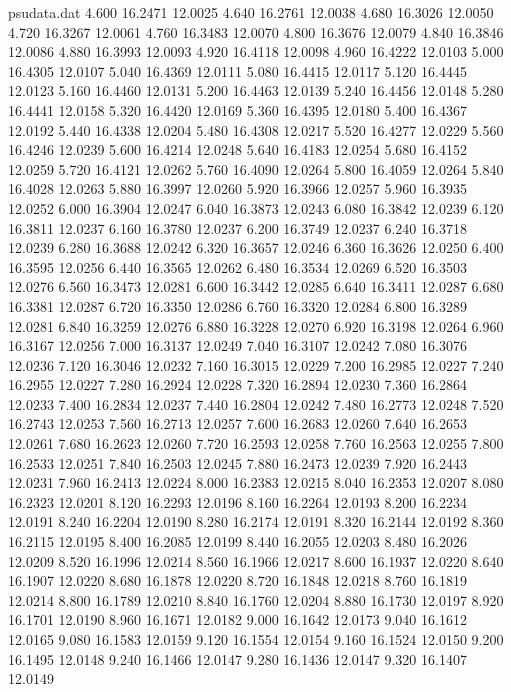 \begin{filecontents*}{psudata.dat}
4.600 16.2471 12.0025
4.640 16.2761 12.0038
4.680 16.3026 12.0050
4.720 16.3267 12.0061
4.760 16.3483 12.0070
4.800 16.3676 12.0079
4.840 16.3846 12.0086
4.880 16.3993 12.0093
4.920 16.4118 12.0098
4.960 16.4222 12.0103
5.000 16.4305 12.0107
5.040 16.4369 12.0111
5.080 16.4415 12.0117
5.120 16.4445 12.0123
5.160 16.4460 12.0131
5.200 16.4463 12.0139
5.240 16.4456 12.0148
5.280 16.4441 12.0158
5.320 16.4420 12.0169
5.360 16.4395 12.0180
5.400 16.4367 12.0192
5.440 16.4338 12.0204
5.480 16.4308 12.0217
5.520 16.4277 12.0229
5.560 16.4246 12.0239
5.600 16.4214 12.0248
5.640 16.4183 12.0254
5.680 16.4152 12.0259
5.720 16.4121 12.0262
5.760 16.4090 12.0264
5.800 16.4059 12.0264
5.840 16.4028 12.0263
5.880 16.3997 12.0260
5.920 16.3966 12.0257
5.960 16.3935 12.0252
6.000 16.3904 12.0247
6.040 16.3873 12.0243
6.080 16.3842 12.0239
6.120 16.3811 12.0237
6.160 16.3780 12.0237
6.200 16.3749 12.0237
6.240 16.3718 12.0239
6.280 16.3688 12.0242
6.320 16.3657 12.0246
6.360 16.3626 12.0250
6.400 16.3595 12.0256
6.440 16.3565 12.0262
6.480 16.3534 12.0269
6.520 16.3503 12.0276
6.560 16.3473 12.0281
6.600 16.3442 12.0285
6.640 16.3411 12.0287
6.680 16.3381 12.0287
6.720 16.3350 12.0286
6.760 16.3320 12.0284
6.800 16.3289 12.0281
6.840 16.3259 12.0276
6.880 16.3228 12.0270
6.920 16.3198 12.0264
6.960 16.3167 12.0256
7.000 16.3137 12.0249
7.040 16.3107 12.0242
7.080 16.3076 12.0236
7.120 16.3046 12.0232
7.160 16.3015 12.0229
7.200 16.2985 12.0227
7.240 16.2955 12.0227
7.280 16.2924 12.0228
7.320 16.2894 12.0230
7.360 16.2864 12.0233
7.400 16.2834 12.0237
7.440 16.2804 12.0242
7.480 16.2773 12.0248
7.520 16.2743 12.0253
7.560 16.2713 12.0257
7.600 16.2683 12.0260
7.640 16.2653 12.0261
7.680 16.2623 12.0260
7.720 16.2593 12.0258
7.760 16.2563 12.0255
7.800 16.2533 12.0251
7.840 16.2503 12.0245
7.880 16.2473 12.0239
7.920 16.2443 12.0231
7.960 16.2413 12.0224
8.000 16.2383 12.0215
8.040 16.2353 12.0207
8.080 16.2323 12.0201
8.120 16.2293 12.0196
8.160 16.2264 12.0193
8.200 16.2234 12.0191
8.240 16.2204 12.0190
8.280 16.2174 12.0191
8.320 16.2144 12.0192
8.360 16.2115 12.0195
8.400 16.2085 12.0199
8.440 16.2055 12.0203
8.480 16.2026 12.0209
8.520 16.1996 12.0214
8.560 16.1966 12.0217
8.600 16.1937 12.0220
8.640 16.1907 12.0220
8.680 16.1878 12.0220
8.720 16.1848 12.0218
8.760 16.1819 12.0214
8.800 16.1789 12.0210
8.840 16.1760 12.0204
8.880 16.1730 12.0197
8.920 16.1701 12.0190
8.960 16.1671 12.0182
9.000 16.1642 12.0173
9.040 16.1612 12.0165
9.080 16.1583 12.0159
9.120 16.1554 12.0154
9.160 16.1524 12.0150
9.200 16.1495 12.0148
9.240 16.1466 12.0147
9.280 16.1436 12.0147
9.320 16.1407 12.0149

\end{filecontents*}
